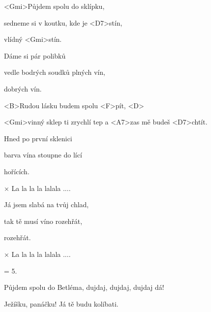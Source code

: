 

\zs
<Gmi>Půjdem spolu do sklípku,

sedneme si v koutku, kde je <D7>stín,

vlídný <Gmi>stín.
\ks

\zs
Dáme si pár polibků

vedle bodrých soudků plných vín,

dobrých vín.
\ks

\zr
<B>Rudou lásku budem spolu <F>pít, <D>

<Gmi>vinný sklep ti zrychlí tep a <A7>zas mě budeš <D7>chtít.
\kr

\zs
Hned po první sklenici

barva vína stoupne do lící

hořících.
\ks

× La la la la lalala ....
\ks

\zr
\kr

\zs
Já jsem slabá na tvůj chlad,

tak tě musí víno rozehřát,

rozehřát.
\ks

× La la la la lalala ....
\ks

\zr
\kr

\zs
= 5.
\ks

\zs
Půjdem spolu do Betléma, dujdaj, dujdaj, dujdaj dá! 

Ježíšku, panáčku! Já tě budu kolíbati. 
\ks 

\kp
